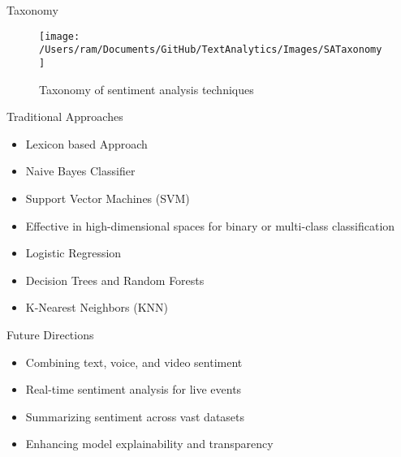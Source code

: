 \begin{frame}{Taxonomy}
\begin{figure}
\centering
\texttt{[image: /Users/ram/Documents/GitHub/TextAnalytics/Images/SATaxonomy]}
\caption[SATaxonomy]{Taxonomy of sentiment analysis techniques}
\label{fig:sataxonomy}
\end{figure}
\end{frame}

\begin{frame}{Traditional Approaches}

\begin{itemize}
    \item Lexicon based Approach
    \item {Naive Bayes Classifier}
	\item Support Vector Machines (SVM)
	\item Effective in high-dimensional spaces for binary or multi-class classification
	\item Logistic Regression
	\item Decision Trees and Random Forests
	\item K-Nearest Neighbors (KNN)
\end{itemize}
\end{frame}

\begin{frame}{Future Directions}
    \begin{itemize}
        \item Combining text, voice, and video sentiment
        \item Real-time sentiment analysis for live events
        \item Summarizing sentiment across vast datasets
        \item Enhancing model explainability and transparency
    \end{itemize}
\end{frame}
